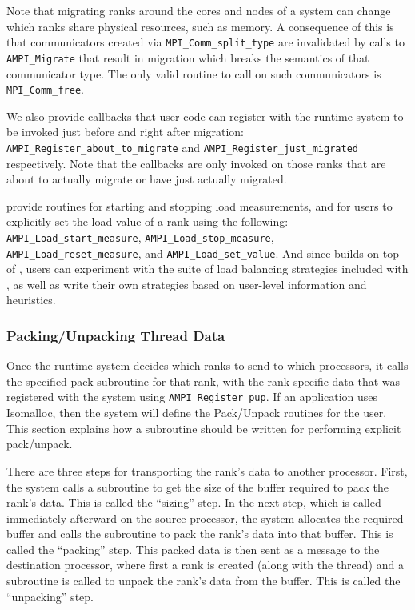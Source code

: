\documentclass[10pt]{article}
\begin{document}
Note that migrating ranks around the cores and nodes of a system can change which
ranks share physical resources, such as memory. A consequence of this is that communicators created
via \texttt{MPI\_Comm\_split\_type} are invalidated by calls to \texttt{AMPI\_Migrate} that result
in migration which breaks the semantics of that communicator type. The only valid routine to call on
such communicators is \texttt{MPI\_Comm\_free}.

We also provide callbacks that user code can register with the runtime system
to be invoked just before and right after migration:
\texttt{AMPI\_Register\_about\_to\_migrate} and
\texttt{AMPI\_Register\_just\_migrated} respectively. Note that the callbacks
are only invoked on those ranks that are about to actually migrate or have
just actually migrated.

\ampi{} provide routines for starting and stopping load measurements, and for
users to explicitly set the load value of a rank using the following:
\texttt{AMPI\_Load\_start\_measure}, \texttt{AMPI\_Load\_stop\_measure},
\texttt{AMPI\_Load\_reset\_measure}, and \texttt{AMPI\_Load\_set\_value}.
And since \ampi{} builds on top of \charmpp{},
users can experiment with the suite of load balancing strategies included with
\charmpp{}, as well as write their own strategies based on user-level
information and heuristics.

\subsubsection{Packing/Unpacking Thread Data}

Once the \ampi{} runtime system decides which ranks to send to which
processors, it calls the specified pack subroutine for that rank, with the
rank-specific data that was registered with the system using
\texttt{AMPI\_Register\_pup}. If an \ampi{} application uses Isomalloc, then
the system will define the Pack/Unpack routines for the user. This section
explains how a subroutine should be written for performing explicit pack/unpack.

There are three steps for transporting the rank's data to another processor.
First, the system calls a subroutine to get the size of the buffer required to
pack the rank's data. This is called the ``sizing'' step. In the next step,
which is called immediately afterward on the source processor, the system
allocates the required buffer and calls the subroutine to pack the rank's data
into that buffer. This is called the ``packing'' step. This packed data is then
sent as a message to the destination processor, where first a rank is created
(along with the thread) and a subroutine is called to unpack the rank's data
from the buffer. This is called the ``unpacking'' step.
\end{document}

